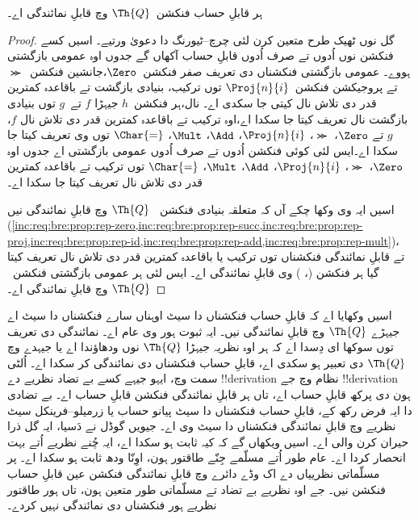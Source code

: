 \documentclass[../../../include/open-logic-section]{subfiles}
\begin{document}

\begin{thm}
ہر قابلِ حساب فنکشن~$\Th{Q}$ وچ قابلِ نمائندگی اے۔
\end{thm}

\begin{proof}
گل نوں ٹھیک طرح متعین کرن لئی چرچ--ٹیورنگ دا دعویٰ ورتیے۔
اسیں کسے فنکشن نوں اُدوں تے صرف اُدوں قابلِ حساب آکھاں گے
جدوں اوہ عمومی بازگشتی ہووے۔ عمومی بازگشتی فنکشناں دی تعریف صفر
فنکشن~$\Zero$،جانشین فنکشن~$\Succ$ تے پروجیکشن
فنکشن~$\Proj{n}{i}$ توں ترکیب، بنیادی بازگشت تے باقاعدہ کمترین قدر دی تلاش نال
کیتی جا سکدی اے۔ نال،ہر فنکشن~$h$
جیہڑا $f$ تے~$g$ توں بنیادی بازگشت نال تعریف کیتا جا سکدا اے،اوہ
ترکیب تے باقاعدہ کمترین قدر دی تلاش نال $f$، $g$ تے $\Zero$،
$\Succ$، $\Proj{n}{i}$، $\Add$، $\Mult$، $\Char{=}$ توں وی تعریف کیتا جا سکدا اے۔ایس لئی کوئی فنکشن اُدوں تے صرف اُدوں عمومی بازگشتی اے جدوں اوہ $\Zero$،
$\Succ$، $\Proj{n}{i}$، $\Add$، $\Mult$، $\Char{=}$ توں ترکیب
تے باقاعدہ کمترین قدر دی تلاش نال تعریف کیتا جا سکدا اے۔

اسیں ایہ وی وکھا چکے آں کہ متعلقہ بنیادی فنکشن
~$\Th{Q}$ وچ قابلِ نمائندگی نیں
(\cref{inc:req:bre:prop:rep-zero,inc:req:bre:prop:rep-succ,inc:req:bre:prop:rep-proj,inc:req:bre:prop:rep-id,inc:req:bre:prop:rep-add,inc:req:bre:prop:rep-mult})،
تے قابلِ نمائندگی فنکشناں توں
ترکیب یا باقاعدہ کمترین قدر دی تلاش نال تعریف کیتا گیا ہر فنکشن
(،
) وی قابلِ نمائندگی اے۔ ایس لئی ہر
عمومی بازگشتی فنکشن~$\Th{Q}$ وچ قابلِ نمائندگی اے۔
\end{proof}

\begin{explain}
اسیں وکھایا اے کہ قابلِ حساب فنکشناں دا سیٹ اوہناں سارے
فنکشناں دا سیٹ اے جیہڑے $\Th{Q}$ وچ قابلِ نمائندگی نیں۔ ایہ ثبوت ہور وی عام
اے۔ نمائندگی دی تعریف توں سوکھا ای دِسدا اے کہ ہر اوہ نظریہ
جیہڑا $\Th{Q}$ نوں ودھاؤندا اے یا جیہدے وچ $\Th{Q}$ دی تعبیر
ہو سکدی اے، قابلِ حساب فنکشناں دی نمائندگی کر سکدا اے۔ اُلٹی
سمت وچ، ایہو جیہے کسے بے تضاد نظریے دے !!{derivation} نظام وچ
جے !!{derivation} ہون دی پرکھ قابلِ حساب اے، تاں ہر قابلِ
نمائندگی فنکشن قابلِ حساب اے۔ بے تضادی دا ایہ فرض رکھ کے،
قابلِ حساب فنکشناں دا سیٹ پیانو حساب یا زرمیلو--فرینکل سیٹ
نظریے وچ قابلِ نمائندگی فنکشناں دا سیٹ وی اے۔ جیویں گوڈل نے
دَسیا، ایہ گل ذرا حیران کرن والی اے۔ اسیں ویکھاں گے کہ کیہ
ثابت ہو سکدا اے، ایہ چُنے نظریے اُتے بہت انحصار کردا اے۔
عام طور اُتے مسلّمے جِنّے طاقتور ہون، اوِنّا ودھ ثابت ہو سکدا
اے۔ پر مسلّماتی نظرییاں دے اک وڈے دائرے وچ قابلِ نمائندگی
فنکشن عین قابلِ حساب فنکشن نیں۔ جے اوہ نظریے بے تضاد تے مسلّماتی
طور متعین ہون، تاں ہور طاقتور نظریے ہور فنکشناں دی نمائندگی
نہیں کردے۔
\end{explain}
\end{document}
